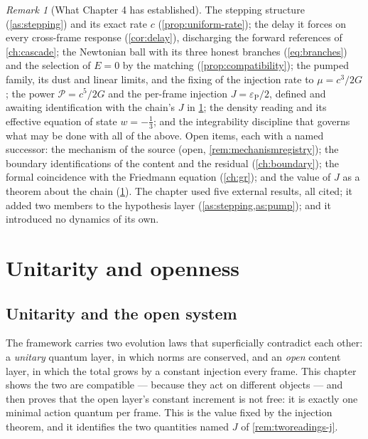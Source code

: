 \documentclass[11pt]{amsbook}
\theoremstyle{plain}
\theoremstyle{definition}
\theoremstyle{remark}
\newtheorem{remark}[theorem]{Remark}
\begin{document}
\begin{remark}[What Chapter 4 has established]\label{rem:ch4summary}
The stepping structure (\cref{as:stepping}) and its exact rate $c$ (\cref{prop:uniform-rate}); the delay it forces on every cross-frame response (\cref{cor:delay}), discharging the forward references of \cref{ch:cascade}; the Newtonian ball with its three honest branches (\cref{eq:branches}) and the selection of $E = 0$ by the matching (\cref{prop:compatibility}); the pumped family, its dust and linear limits, and the fixing of the injection rate to $\mu = c^{3}/2G$; the power $\mathcal P = c^{5}/2G$ and the per-frame injection $J = \varepsilon_{\mathrm P}/2$, defined and awaiting identification with the chain's $J$ in \cref{ch:unitarity}; the density reading and its effective equation of state $w = -\tfrac13$; and the integrability discipline that governs what may be done with all of the above. Open items, each with a named successor: the mechanism of the source (open, \cref{rem:mechanismregistry}); the boundary identifications of the content and the residual (\cref{ch:boundary}); the formal coincidence with the Friedmann equation (\cref{ch:gr}); and the value of $J$ as a theorem about the chain (\cref{ch:unitarity}). The chapter used five external results, all cited; it added two members to the hypothesis layer (\cref{as:stepping,as:pump}); and it introduced no dynamics of its own.
\end{remark}

\part{Unitarity and openness}

\chapter{Unitarity and the open system}\label{ch:unitarity}

The framework carries two evolution laws that superficially contradict each other: a \emph{unitary} quantum layer, in which norms are conserved, and an \emph{open} content layer, in which the total grows by a constant injection every frame. This chapter shows the two are compatible --- because they act on different objects --- and then proves that the open layer's constant increment is not free: it is exactly one minimal action quantum per frame. This is the value fixed by the injection theorem, and it identifies the two quantities named $J$ of \cref{rem:tworeadings-j}.
\end{document}
